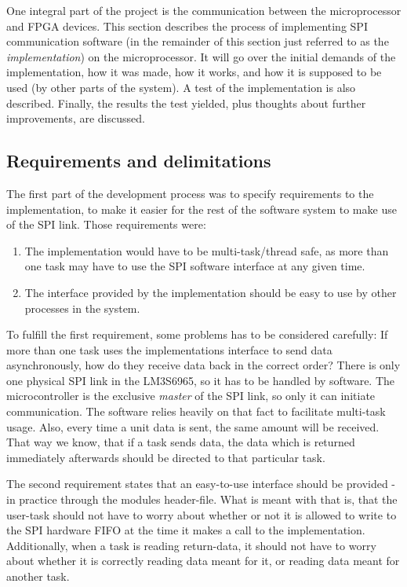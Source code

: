 One integral part of the project is the communication between the microprocessor and FPGA devices. This section describes the process of implementing SPI communication software (in the remainder of this section just referred to as the \textit{implementation}) on the microprocessor. It will go over the initial demands of the implementation, how it was made, how it works, and how it is supposed to be used (by other parts of the system). A test of the implementation is also described. Finally, the results the test yielded, plus thoughts about further improvements, are discussed.

\subsection{Requirements and delimitations}\label{sec:spi_software_reqs}
The first part of the development process was to specify requirements to the implementation, to make it easier for the rest of the software system to make use of the SPI link. Those requirements were:
\begin{enumerate}
  \item The implementation would have to be multi-task/thread safe, as more than one task may have to use the SPI software interface at any given time.
  \item The interface provided by the implementation should be easy to use by other processes in the system.
\end{enumerate}

To fulfill the first requirement, some problems has to be considered carefully: If more than one task uses the implementations interface to send data asynchronously, how do they receive data back in the correct order? There is only one physical SPI link in the LM3S6965, so it has to be handled by software.
The microcontroller is the exclusive \textit{master} of the SPI link, so only it can initiate communication. The software relies heavily on that fact to facilitate multi-task usage. Also, every time a unit data is sent, the same amount will be received. That way we know, that if a task sends data, the data which is returned immediately afterwards should be directed to that particular task.

The second requirement states that an easy-to-use interface should be provided - in practice through the modules header-file. What is meant with that is, that the user-task should not have to worry about whether or not it is allowed to write to the SPI hardware FIFO at the time it makes a call to the implementation. Additionally, when a task is reading return-data, it should not have to worry about whether it is correctly reading data meant for it, or reading data meant for another task.

